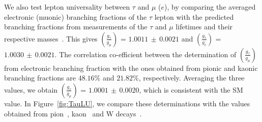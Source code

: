 \documentclass[fleqn,twoside]{article}
\begin{document}
We also test lepton universality between $\tau$ and $\mu$ ($e$),
by comparing the averaged electronic (muonic) branching fractions of
the $\tau$ lepton with the predicted branching fractions from measurements
of the $\tau$ and $\mu$ lifetimes and their respective masses~\cite{PDG_2010}.
This gives 
$\left( \frac{g_{\tau}}{g_{\mu}} \right)$ = $1.0011\, \pm\, 0.0021$
and
$\left( \frac{g_{\tau}}{g_{e}} \right)$ = $1.0030\, \pm\, 0.0021$.
The correlation co-efficient between the determination of
$\left( \frac{g_{\tau}}{g_{\mu}} \right)$ from electronic branching
fraction with the ones obtained from pionic and kaonic branching fractions
are $48.16\%$ and  $21.82\%$, respectively.
Averaging the three values, we obtain
$\left( \frac{g_{\tau}}{g_{\mu}} \right)$ = $1.0001\, \pm\, 0.0020$,
which is consistent with the SM value.
In Figure~\ref{fig:TauLU}, we compare these determinations 
with the values obtained from pion~\cite{PiToMu},
kaon~\cite{Antonelli:2010yf} and W decays~\cite{Alcaraz:2006mx}.
\end{document}
